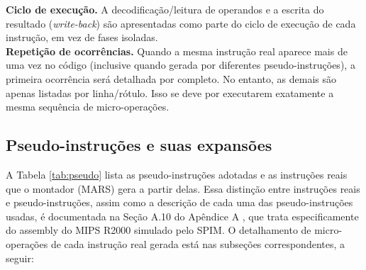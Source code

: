 \textbf{Ciclo de execução.} A decodificação/leitura de operandos e a escrita do resultado
(\textit{write-back}) são apresentadas como parte do ciclo de execução de
cada instrução, em vez de fases isoladas. \\

\textbf{Repetição de ocorrências.} Quando a mesma instrução real aparece
mais de uma vez no código (inclusive quando gerada por diferentes
pseudo-instruções), a primeira ocorrência será detalhada por completo. No entanto, as
demais são apenas listadas por linha/rótulo. Isso se deve por executarem exatamente a mesma sequência de micro-operações.

\subsection{Pseudo-instruções e suas expansões}

A Tabela \ref{tab:pseudo} lista as pseudo-instruções adotadas e as instruções reais que o montador (MARS) gera a partir
delas. Essa distinção entre instruções reais e pseudo-instruções, assim
como a descrição de cada uma das pseudo-instruções usadas, é
documentada na Seção A.10 do Apêndice A \cite{patterson2017}, que trata
especificamente do assembly do MIPS R2000 simulado pelo SPIM. O
detalhamento de micro-operações de cada instrução real gerada está nas
subseções correspondentes, a seguir:

